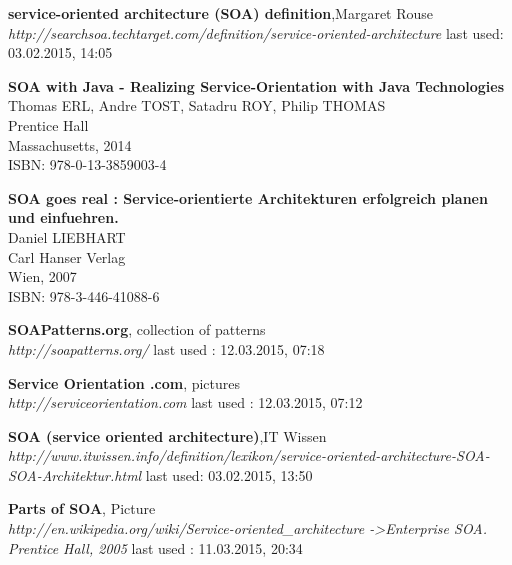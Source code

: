 \documentclass[12pt]{article}
\begin{document}
\listoffigures
\printglossaries
\begin{thebibliography}{56}

   \textbf{service-oriented architecture (SOA) definition},Margaret Rouse \\
  \textit{http://searchsoa.techtarget.com/definition/service-oriented-architecture}
  \newline last used: 03.02.2015, 14:05

   \textbf{SOA with Java - Realizing Service-Orientation with Java Technologies}\\
   Thomas ERL, Andre TOST, Satadru ROY, Philip THOMAS \\ 
   Prentice Hall \\
   Massachusetts, 2014 \\
	ISBN: 978-0-13-3859003-4 

   \textbf{SOA goes real : Service-orientierte Architekturen erfolgreich planen und einfuehren.}\\
   Daniel LIEBHART \\ 
   Carl Hanser Verlag \\
   Wien, 2007 \\
	ISBN: 978-3-446-41088-6

  \textbf{SOAPatterns.org}, collection of patterns\\
  \textit{http://soapatterns.org/}
  \newline last used : 12.03.2015, 07:18

  \textbf{Service Orientation .com}, pictures\\
  \textit{http://serviceorientation.com}
  \newline last used : 12.03.2015, 07:12

   \textbf{SOA (service oriented architecture)},IT Wissen \\
  \textit{http://www.itwissen.info/definition/lexikon/service-oriented-architecture-SOA-SOA-Architektur.html}
  \newline last used: 03.02.2015, 13:50

   
   \textbf{Parts of SOA}, Picture \\
  \textit{http://en.wikipedia.org/wiki/Service-oriented\_architecture -\textgreater Enterprise SOA. Prentice Hall, 2005}
  \newline last used : 11.03.2015, 20:34 	


\end{thebibliography}
\end{document}

